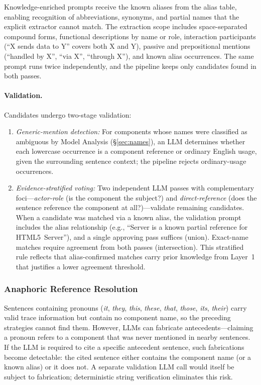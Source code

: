 Knowledge-enriched prompts receive the known aliases from the
alias table, enabling recognition of abbreviations, synonyms, and
partial names that the explicit extractor cannot match.
The extraction scope includes space-separated compound forms,
functional descriptions by name or role, interaction participants
(``X sends data to Y'' covers both X and Y),
passive and prepositional mentions (``handled by X'', ``via X'',
``through X''), and known alias occurrences.
The same prompt runs twice independently, and the pipeline keeps
only candidates found in both passes.

\paragraph{Validation.}
Candidates undergo two-stage validation:
\begin{enumerate}
    \item \emph{Generic-mention detection:}
      For components whose names were classified as ambiguous by
      Model Analysis (\S\ref{sec:names}), an LLM determines
      whether each lowercase occurrence is a component reference or
      ordinary English usage, given the surrounding sentence context;
      the pipeline rejects ordinary-usage occurrences.
    \item \emph{Evidence-stratified voting:}
      Two independent LLM passes with complementary
      foci---\emph{actor-role} (is the component the subject?)
      and \emph{direct-reference} (does the sentence reference the
      component at all?)---validate remaining candidates.
      When a candidate was matched via a known alias, the validation
      prompt includes the alias relationship (e.g., ``Server is a
      known partial reference for HTML5~Server''), and a single
      approving pass suffices (union).
      Exact-name matches require agreement from both passes
      (intersection).
      This stratified rule reflects that alias-confirmed
      matches carry prior knowledge from Layer~1 that justifies
      a lower agreement threshold.
\end{enumerate}

\subsubsection{Anaphoric Reference Resolution}\label{sec:coref}

Sentences containing pronouns (\emph{it}, \emph{they}, \emph{this},
\emph{these}, \emph{that}, \emph{those}, \emph{its}, \emph{their})
carry valid trace information but contain no component name, so
the preceding strategies cannot find them.
However, LLMs can fabricate antecedents---claiming a pronoun refers
to a component that was never mentioned in nearby sentences.
If the LLM is required to cite a specific antecedent sentence,
such fabrications become detectable: the cited sentence either
contains the component name (or a known alias) or it does not.
A separate validation LLM call would itself be subject to
fabrication; deterministic string verification eliminates this risk.

